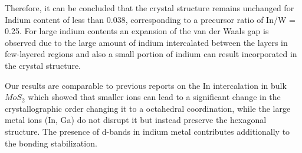 Therefore, it can be concluded that the crystal structure remains unchanged for Indium content of less than 0.038, corresponding to a precursor ratio of In/W = 0.25. For large indium contents an expansion of the van der Waals gap is observed due to the large amount of indium intercalated between the layers in few-layered regions and also a small portion of indium can result incorporated in the crystal structure. 

Our results are comparable to previous reports on the In intercalation in bulk $MoS_2$ which showed that smaller ions can lead to a significant change in the crystallographic order \cite{Somoano1979} changing it to a octahedral coordination, while the large metal ions (In, Ga) do not disrupt it but instead preserve the hexagonal structure. The presence of d-bands in indium metal contributes additionally to the bonding stabilization.

